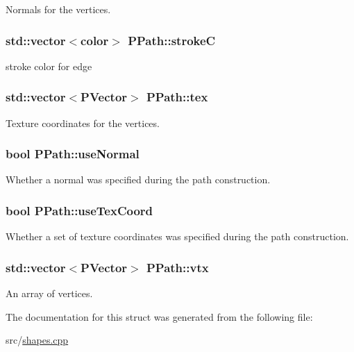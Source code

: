\-Normals for the vertices. 

\hypertarget{structPPath_a9617b499180498fafdb36f206b9e4831}{
\subsubsection[{stroke\-C}]{\setlength{\rightskip}{0pt plus 5cm}std\-::vector$<${\bf color}$>$ {\bf \-P\-Path\-::stroke\-C}}}\label{structPPath_a9617b499180498fafdb36f206b9e4831}


stroke color for edge 

\hypertarget{structPPath_acda3dc5da7e49ceab397ba6d69190196}{
\subsubsection[{tex}]{\setlength{\rightskip}{0pt plus 5cm}std\-::vector$<${\bf \-P\-Vector}$>$ {\bf \-P\-Path\-::tex}}}\label{structPPath_acda3dc5da7e49ceab397ba6d69190196}


\-Texture coordinates for the vertices. 

\hypertarget{structPPath_ac87e8c7b45a255bef6b26a8d01561d68}{
\subsubsection[{use\-Normal}]{\setlength{\rightskip}{0pt plus 5cm}bool {\bf \-P\-Path\-::use\-Normal}}}\label{structPPath_ac87e8c7b45a255bef6b26a8d01561d68}


\-Whether a normal was specified during the path construction. 

\hypertarget{structPPath_aa6f1ee80b0ac2af7dd7196e5b3f65a96}{
\subsubsection[{use\-Tex\-Coord}]{\setlength{\rightskip}{0pt plus 5cm}bool {\bf \-P\-Path\-::use\-Tex\-Coord}}}\label{structPPath_aa6f1ee80b0ac2af7dd7196e5b3f65a96}


\-Whether a set of texture coordinates was specified during the path construction. 

\hypertarget{structPPath_a155917dd334970ab34db0d305d7d35ca}{
\subsubsection[{vtx}]{\setlength{\rightskip}{0pt plus 5cm}std\-::vector$<${\bf \-P\-Vector}$>$ {\bf \-P\-Path\-::vtx}}}\label{structPPath_a155917dd334970ab34db0d305d7d35ca}


\-An array of vertices. 



\-The documentation for this struct was generated from the following file\-:\begin{DoxyCompactItemize}
\item 
src/\hyperlink{shapes_8cpp}{shapes.\-cpp}\end{DoxyCompactItemize}
